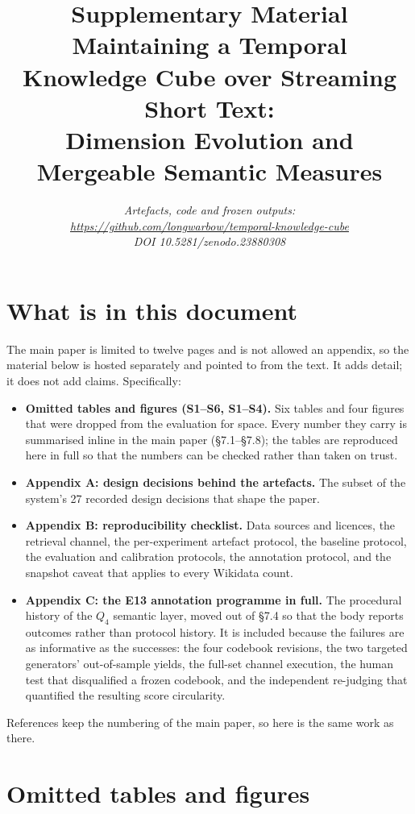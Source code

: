 \documentclass[10pt]{article}
\title{\vspace{-2.6em}Supplementary Material\\[0.45em]
       \large Maintaining a Temporal Knowledge Cube over Streaming Short Text:\\
       \large Dimension Evolution and Mergeable Semantic Measures}
\author{}
\date{\small\itshape Artefacts, code and frozen outputs:\\
       \url{https://github.com/longwarbow/temporal-knowledge-cube}\\
       DOI 10.5281/zenodo.23880308}
\begin{document}
\maketitle
\vspace{-3.2em}

{\small\tableofcontents}

\section*{What is in this document}

The main paper is limited to twelve pages and is not allowed an appendix, so the
material below is hosted separately and pointed to from the text. It adds detail;
it does not add claims. Specifically:

\begin{itemize}
\item \textbf{Omitted tables and figures (S1--S6, S1--S4).} Six tables and four
figures that were dropped from the evaluation for space. Every number they carry
is summarised inline in the main paper (\S7.1--\S7.8); the tables are reproduced
here in full so that the numbers can be checked rather than taken on trust.
\item \textbf{Appendix A: design decisions behind the artefacts.} The subset of
the system's 27 recorded design decisions that shape the paper.
\item \textbf{Appendix B: reproducibility checklist.} Data sources and licences,
the retrieval channel, the per-experiment artefact protocol, the baseline protocol,
the evaluation and calibration protocols, the annotation protocol, and the
snapshot caveat that applies to every Wikidata count.
\item \textbf{Appendix C: the E13 annotation programme in full.} The procedural
history of the $Q_4$ semantic layer, moved out of \S7.4 so that the body reports
outcomes rather than protocol history. It is included because the failures are as
informative as the successes: the four codebook revisions, the two targeted
generators' out-of-sample yields, the full-set channel execution, the human test
that disqualified a frozen codebook, and the independent re-judging that
quantified the resulting score circularity.
\end{itemize}

\noindent References keep the numbering of the main paper, so \cite{r5} here is
the same work as \cite{r5} there.

\section*{Omitted tables and figures}















\end{document}
